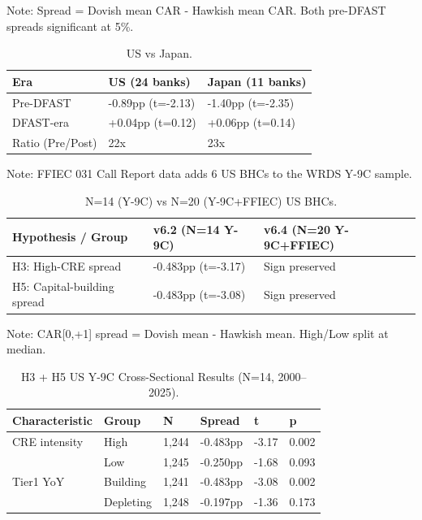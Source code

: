 \documentclass[12pt,a4paper]{article}
\begin{document}
Note: Spread = Dovish mean CAR - Hawkish mean CAR. Both pre-DFAST spreads significant at 5\%.

\begin{table}[H]
\centering
\caption{US vs Japan.}
\label{tab:regime_shift}
\small
\begin{tabular}{lll}
\toprule
Era & US (24 banks) & Japan (11 banks) \\
\midrule
Pre-DFAST & -0.89pp (t=-2.13) & -1.40pp (t=-2.35) \\
DFAST-era & +0.04pp (t=0.12) & +0.06pp (t=0.14) \\
Ratio (Pre/Post) & 22x  & 23x  \\
\bottomrule
\end{tabular}
\end{table}

Note: FFIEC 031 Call Report data adds 6 US BHCs to the WRDS Y-9C sample.

\begin{table}[H]
\centering
\caption{N=14 (Y-9C) vs N=20 (Y-9C+FFIEC) US BHCs.}
\label{tab:ffiec}
\small
\begin{tabular}{lll}
\toprule
Hypothesis / Group & v6.2 (N=14 Y-9C) & v6.4 (N=20 Y-9C+FFIEC) \\
\midrule
H3: High-CRE spread & -0.483pp (t=-3.17) & Sign preserved \\
H5: Capital-building spread & -0.483pp (t=-3.08) & Sign preserved \\
\bottomrule
\end{tabular}
\end{table}

Note: CAR[0,+1] spread = Dovish mean - Hawkish mean. High/Low split at median.

\begin{table}[H]
\centering
\caption{H3 + H5 US Y-9C Cross-Sectional Results (N=14, 2000–2025).}
\label{tab:cross_section}
\small
\begin{tabular}{llllll}
\toprule
Characteristic & Group & N & Spread & t & p \\
\midrule
CRE intensity & High & 1,244 & -0.483pp & -3.17 & 0.002 \\
 & Low & 1,245 & -0.250pp & -1.68 & 0.093 \\
Tier1 YoY & Building & 1,241 & -0.483pp & -3.08 & 0.002 \\
 & Depleting & 1,248 & -0.197pp & -1.36 & 0.173 \\
\bottomrule
\end{tabular}
\end{table}
\end{document}

